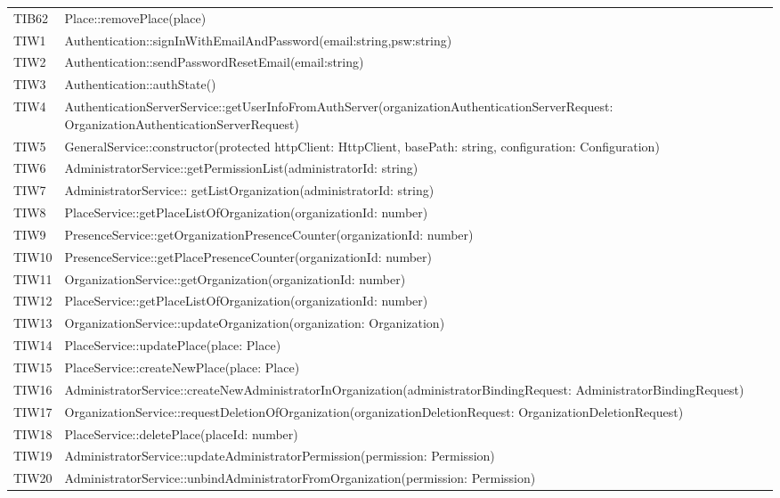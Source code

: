 {\begin{longtable}{C{2cm} C{12cm}}
	TIB62 & Place::removePlace(place) \\
	TIW1 & Authentication::signInWithEmailAndPassword(email:string,psw:string) \\
	TIW2 & Authentication::sendPasswordResetEmail(email:string) \\
	TIW3 & Authentication::authState()\\
	TIW4 & AuthenticationServerService::getUserInfoFromAuthServer(organizationAuthenticationServerRequest: OrganizationAuthenticationServerRequest) \\
	TIW5 & GeneralService::constructor(protected httpClient: HttpClient, basePath: string, configuration: Configuration) \\
	TIW6 & AdministratorService::getPermissionList(administratorId: string)\\
	TIW7 & AdministratorService:: getListOrganization(administratorId: string)\\
	TIW8 & PlaceService::getPlaceListOfOrganization(organizationId: number)\\
	TIW9 & PresenceService::getOrganizationPresenceCounter(organizationId: number)\\
	TIW10 & PresenceService::getPlacePresenceCounter(organizationId: number)\\
	TIW11 & OrganizationService::getOrganization(organizationId: number)\\
	TIW12 & PlaceService::getPlaceListOfOrganization(organizationId: number)\\
	TIW13 & OrganizationService::updateOrganization(organization: Organization)\\
	TIW14 & PlaceService::updatePlace(place: Place)\\
	TIW15 & PlaceService::createNewPlace(place: Place)\\
	TIW16 & AdministratorService::createNewAdministratorInOrganization(administratorBindingRequest: AdministratorBindingRequest)\\
	TIW17 & OrganizationService::requestDeletionOfOrganization(organizationDeletionRequest: OrganizationDeletionRequest)\\
	TIW18 & PlaceService::deletePlace(placeId: number)\\
	TIW19 & AdministratorService::updateAdministratorPermission(permission: Permission)\\
	TIW20 & AdministratorService::unbindAdministratorFromOrganization(permission: Permission)\\


\end{longtable}
}
